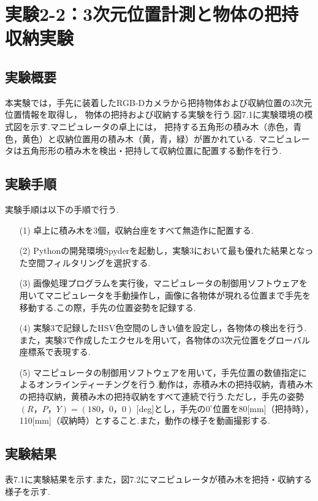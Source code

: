 \section{実験2-2：3次元位置計測と物体の把持収納実験}

\subsection{実験概要}
本実験では，手先に装着したRGB-Dカメラから把持物体および収納位置の3次元位置情報を取得し，
物体の把持および収納する実験を行う.図7.1に実験環境の模式図を示す.マニピュレータの卓上には，
把持する五角形の積み木（赤色，青色，黄色）と収納位置用の積み木（黄，青，緑）が置かれている.
マニピュレータは五角形形の積み木を検出・把持して収納位置に配置する動作を行う.

\subsection{実験手順}
実験手順は以下の手順で行う.

\begin{enumerate}
  \item[(1)] 卓上に積み木を3個，収納台座をすべて無造作に配置する.
  \item[(2)] Pythonの開発環境Spyderを起動し，実験3において最も優れた結果となった空間フィルタリングを選択する.
  \item[(3)] 画像処理プログラムを実行後，マニピュレータの制御用ソフトウェアを用いてマニピュレータを手動操作し，画像に各物体が現れる位置まで手先を移動する.この際，手先の位置姿勢を記録する.
  \item[(4)] 実験3で記録したHSV色空間のしきい値を設定し，各物体の検出を行う.また，実験3で作成したエクセルを用いて，各物体の3次元位置をグローバル座標系で表現する.
  \item[(5)] マニピュレータの制御用ソフトウェアを用いて，手先位置の数値指定によるオンラインティーチングを行う.動作は，赤積み木の把持収納，青積み木の把持収納，黄積み木の把持収納をすべて連続で行う.ただし，手先の姿勢$(R， P， Y) = (180， 0， 0)$ [deg]とし，手先の$0^{\circ}$位置を80[mm]（把持時），110[mm]（収納時）とすること.また，動作の様子を動画撮影する.
\end{enumerate}

\subsection{実験結果}
表7.1に実験結果を示す.また，図7.2にマニピュレータが積み木を把持・収納する様子を示す.

